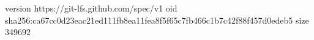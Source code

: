 version https://git-lfs.github.com/spec/v1
oid sha256:ca67cc0d23eac21ed111fb8ea11fea8f5f65c7fb466c1b7c42f88f457d0edeb5
size 349692
